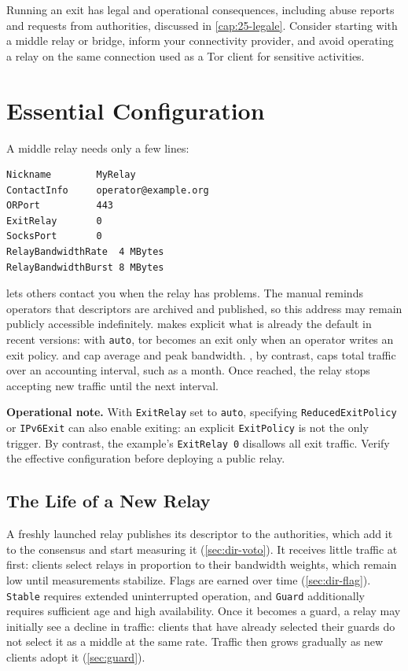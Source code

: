 \begin{attenzione}
Running an exit has legal and operational consequences, including abuse reports and requests from authorities, discussed in \cref{cap:25-legale}. Consider starting with a middle relay or bridge, inform your connectivity provider, and avoid operating a relay on the same connection used as a Tor client for sensitive activities.
\end{attenzione}

\section{Essential Configuration}\label{sec:relay-config}

A middle relay needs only a few  lines:
\begin{lstlisting}[numbers=none]
Nickname        MyRelay
ContactInfo     operator@example.org
ORPort          443
ExitRelay       0
SocksPort       0
RelayBandwidthRate  4 MBytes
RelayBandwidthBurst 8 MBytes
\end{lstlisting}
 lets others contact you when the relay has problems. The manual reminds operators that descriptors are archived and published, so this address may remain publicly accessible indefinitely.  makes explicit what is already the default in recent versions: with \texttt{auto}, tor becomes an exit only when an operator writes an exit policy.  and  cap average and peak bandwidth. , by contrast, caps total traffic over an accounting interval, such as a month. Once reached, the relay stops accepting new traffic until the next interval.

\textbf{Operational note.} With \texttt{ExitRelay} set to \texttt{auto}, specifying \texttt{ReducedExitPolicy} or \texttt{IPv6Exit} can also enable exiting: an explicit \texttt{ExitPolicy} is not the only trigger. By contrast, the example's \texttt{ExitRelay 0} disallows all exit traffic. Verify the effective configuration before deploying a public relay.

\subsection{The Life of a New Relay}

A freshly launched relay publishes its descriptor to the authorities, which add it to the consensus and start measuring it (\cref{sec:dir-voto}). It receives little traffic at first: clients select relays in proportion to their bandwidth weights, which remain low until measurements stabilize. Flags are earned over time (\cref{sec:dir-flag}). \texttt{Stable} requires extended uninterrupted operation, and \texttt{Guard} additionally requires sufficient age and high availability. Once it becomes a guard, a relay may initially see a decline in traffic: clients that have already selected their guards do not select it as a middle at the same rate. Traffic then grows gradually as new clients adopt it (\cref{sec:guard}).

